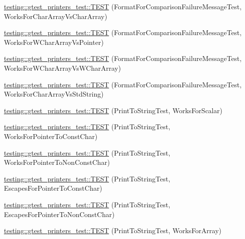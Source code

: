 \begin{DoxyCompactItemize}
\item 
\mbox{\hyperlink{namespacetesting_1_1gtest__printers__test_aba32640344f0186de5fbb6bb47e0c5a5}{testing\+::gtest\+\_\+printers\+\_\+test\+::\+T\+E\+ST}} (Format\+For\+Comparison\+Failure\+Message\+Test, Works\+For\+Char\+Array\+Vs\+Char\+Array)
\item 
\mbox{\hyperlink{namespacetesting_1_1gtest__printers__test_a1e95289500400eff5fdcd45c5864a6d2}{testing\+::gtest\+\_\+printers\+\_\+test\+::\+T\+E\+ST}} (Format\+For\+Comparison\+Failure\+Message\+Test, Works\+For\+W\+Char\+Array\+Vs\+Pointer)
\item 
\mbox{\hyperlink{namespacetesting_1_1gtest__printers__test_af4b502fb5745d2ee0bfb81d1c8eb95f6}{testing\+::gtest\+\_\+printers\+\_\+test\+::\+T\+E\+ST}} (Format\+For\+Comparison\+Failure\+Message\+Test, Works\+For\+W\+Char\+Array\+Vs\+W\+Char\+Array)
\item 
\mbox{\hyperlink{namespacetesting_1_1gtest__printers__test_ac2300073f401f783ff7b1ef97d2cbd6d}{testing\+::gtest\+\_\+printers\+\_\+test\+::\+T\+E\+ST}} (Format\+For\+Comparison\+Failure\+Message\+Test, Works\+For\+Char\+Array\+Vs\+Std\+String)
\item 
\mbox{\hyperlink{namespacetesting_1_1gtest__printers__test_a5d1bc4b12c18ccaec2ced9f45c092567}{testing\+::gtest\+\_\+printers\+\_\+test\+::\+T\+E\+ST}} (Print\+To\+String\+Test, Works\+For\+Scalar)
\item 
\mbox{\hyperlink{namespacetesting_1_1gtest__printers__test_a68100148758516ebab9c761ca7778586}{testing\+::gtest\+\_\+printers\+\_\+test\+::\+T\+E\+ST}} (Print\+To\+String\+Test, Works\+For\+Pointer\+To\+Const\+Char)
\item 
\mbox{\hyperlink{namespacetesting_1_1gtest__printers__test_a1db34d8760c17157572ce2877007d15a}{testing\+::gtest\+\_\+printers\+\_\+test\+::\+T\+E\+ST}} (Print\+To\+String\+Test, Works\+For\+Pointer\+To\+Non\+Const\+Char)
\item 
\mbox{\hyperlink{namespacetesting_1_1gtest__printers__test_ab8fce4287e837cfcd851ded56b62f9ce}{testing\+::gtest\+\_\+printers\+\_\+test\+::\+T\+E\+ST}} (Print\+To\+String\+Test, Escapes\+For\+Pointer\+To\+Const\+Char)
\item 
\mbox{\hyperlink{namespacetesting_1_1gtest__printers__test_a7203081ef422f0835643d2c54b8ebf28}{testing\+::gtest\+\_\+printers\+\_\+test\+::\+T\+E\+ST}} (Print\+To\+String\+Test, Escapes\+For\+Pointer\+To\+Non\+Const\+Char)
\item 
\mbox{\hyperlink{namespacetesting_1_1gtest__printers__test_a78bd89af8a8505880b78ec2a001d3cb8}{testing\+::gtest\+\_\+printers\+\_\+test\+::\+T\+E\+ST}} (Print\+To\+String\+Test, Works\+For\+Array)

\end{DoxyCompactItemize}
